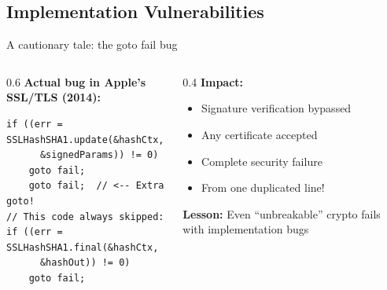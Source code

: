 \ifdefined\PRESENTATION\else\PassOptionsToClass{handout}{beamer}\fi\documentclass[aspectratio=169, lualatex]{beamer}
\begin{document}
\subsection{Implementation Vulnerabilities}

\begin{frame}[fragile]{A cautionary tale: the goto fail bug}
	\begin{columns}[c]
		\begin{column}{0.6\textwidth}
			\textbf{Actual bug in Apple's SSL/TLS (2014):}
			\begin{verbatim}
if ((err = SSLHashSHA1.update(&hashCtx,
      &signedParams)) != 0)
    goto fail;
    goto fail;  // <-- Extra goto!
// This code always skipped:
if ((err = SSLHashSHA1.final(&hashCtx,
      &hashOut)) != 0)
    goto fail;
   \end{verbatim}
		\end{column}
		\begin{column}{0.4\textwidth}
			\textbf{Impact:}
			\begin{itemize}
				\item Signature verification bypassed
				\item Any certificate accepted
				\item Complete security failure
				\item From one duplicated line!
			\end{itemize}

			\textbf{Lesson:} Even ``unbreakable'' crypto fails with implementation bugs
		\end{column}
	\end{columns}
\end{frame}
\end{document}
